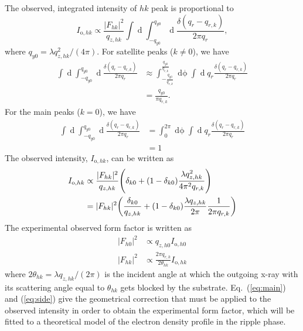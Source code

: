 \documentclass[12pt,letterpaper]{article}
\begin{document}
The observed, integrated intensity of $hk$ peak is proportional to
\begin{equation}
  I_{\mathrm{o},hk} 
    \propto \frac{\lvert F_{hk} \rvert^2}{q_{z,hk}} \int\mathop{dq_x} 
            \int_{-q_{y0}}^{q_{y0}}
            \mathop{dq_y} \frac{\delta(q_r-q_{r,k})}{2\pi q_r},
\end{equation}
where $q_{y0} = \lambda q_{z,hk}^2/(4\pi)$.
For satellite peaks ($k \neq 0$), we have 
\begin{align}
  \int\mathop{dq_x} \int_{-q_{y0}}^{q_{y0}}\mathop{dq_y} \frac{\delta(q_r-q_{r,k})}{2\pi q_r}
  &\approx \int_{-\frac{q_{y0}}{q_{r,k}}}^{\frac{q_{y0}}{q_{r,k}}} \mathop{d\phi} 
          \int \mathop{dq_r} q_r\frac{\delta(q_r-q_{r,k})}{2\pi q_r} \\
 &= \frac{q_{y0}}{\pi q_{r,k}}.
\end{align}
For the main peaks ($k=0$), we have 
\begin{align}
  \int\mathop{dq_x} \int_{-q_{y0}}^{q_{y0}}\mathop{dq_y} \frac{\delta(q_r-q_{r,k})}{2\pi q_r}
  &= \int_0^{2\pi}\mathop{d\phi} \int\mathop{dq_r} q_r\frac{\delta(q_r-q_{r,k})}{2\pi q_r} \\
  &= 1
\end{align}
The observed intensity, $I_{\mathrm{o},hk}$, can be written as
\begin{align}
  I_{\mathrm{o},hk} &\propto \frac{|F_{hk}|^2}{q_{z,hk}}
                    \mathopen{}\left( \delta_{k0}+(1-\delta_{k0})\frac{\lambda q_{z,hk}^2}{4\pi^2 q_{r,k}} \right)\mathclose{} \\
  &= |F_{hk}|^2 \mathopen{}\left( \frac{\delta_{k0}}{q_{z,hk}}+(1-\delta_{k0})\frac{\lambda q_{z,hk}}{2\pi}
  \frac{1}{2\pi q_{r,k}} \right)\mathclose{}
\end{align}
The experimental observed form factor is written as 
\begin{align}
  |F_{h0}|^2 &\propto q_{z,h0} I_{\mathrm{o},h0} \label{eq:main}\\
  |F_{hk}|^2 &\propto \frac{2\pi q_{r,k}}{2\theta_{hk}} I_{\mathrm{o},hk} \label{eq:side} 
\end{align}
where $2\theta_{hk} = \lambda q_{z,hk}/(2\pi)$ is the incident angle at which 
the outgoing x-ray with its scattering angle equal to $\theta_{hk}$ gets 
blocked by the substrate. Eq.~(\ref{eq:main}) and (\ref{eq:side}) give the 
geometrical correction that must be applied to the observed intensity
in order to obtain the experimental form factor, which will be fitted to
a theoretical model of the electron density profile in the ripple phase. 

\cite{ref:Sengupta03}
\cite{ref:deVries05}
\end{document}
